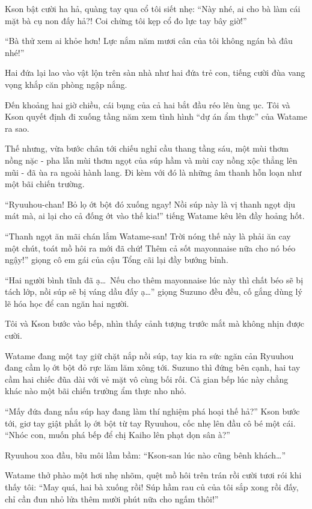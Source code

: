 \documentclass[../main.tex]{subfiles}
\begin{document}
Kson bật cười ha hả, quàng tay qua cổ tôi siết nhẹ: ``Này nhé, ai cho bà làm cái mặt bà cụ non đấy hả?! Coi chừng tôi kẹp cổ đo lực tay bây giờ!''

``Bà thử xem ai khỏe hơn! Lực nắm năm mươi cân của tôi không ngán bà đâu nhé!''

Hai đứa lại lao vào vật lộn trên sàn nhà như hai đứa trẻ con, tiếng cười đùa vang vọng khắp căn phòng ngập nắng.

\ct

Đến khoảng hai giờ chiều, cái bụng của cả hai bắt đầu réo lên ùng ục. Tôi và Kson quyết định đi xuống tầng năm xem tình hình ``dự án ẩm thực'' của Watame ra sao.

Thế nhưng, vừa bước chân tới chiếu nghỉ cầu thang tầng sáu, một mùi thơm nồng nặc - pha lẫn mùi thơm ngọt của súp hầm và mùi cay nồng xộc thẳng lên mũi - đã ùa ra ngoài hành lang. Đi kèm với đó là những âm thanh hỗn loạn như một bãi chiến trường.

``Ryuuhou-chan! Bỏ lọ ớt bột đó xuống ngay! Nồi súp này là vị thanh ngọt dịu mát mà, ai lại cho cả đống ớt vào thế kia!'' tiếng Watame kêu lên đầy hoảng hốt.

``Thanh ngọt ăn mãi chán lắm Watame-san! Trời nóng thế này là phải ăn cay một chút, toát mồ hôi ra mới đã chứ! Thêm cả sốt mayonnaise nữa cho nó béo ngậy!'' giọng cô em gái của cậu Tổng cãi lại đầy bướng bỉnh.

``Hai người bình tĩnh đã ạ\dots\ Nếu cho thêm mayonnaise lúc này thì chất béo sẽ bị tách lớp, nồi súp sẽ bị váng dầu đấy ạ\dots'' giọng Suzuno đều đều, cố gắng dùng lý lẽ hóa học để can ngăn hai người.

Tôi và Kson bước vào bếp, nhìn thấy cảnh tượng trước mắt mà không nhịn được cười.

Watame đang một tay giữ chặt nắp nồi súp, tay kia ra sức ngăn cản Ryuuhou đang cầm lọ ớt bột đỏ rực lăm lăm xông tới. Suzuno thì đứng bên cạnh, hai tay cầm hai chiếc đũa dài với vẻ mặt vô cùng bối rối. Cả gian bếp lúc này chẳng khác nào một bãi chiến trường ẩm thực nho nhỏ.

``Mấy đứa đang nấu súp hay đang làm thí nghiệm phá hoại thế hả?'' Kson bước tới, giơ tay giật phắt lọ ớt bột từ tay Ryuuhou, cốc nhẹ lên đầu cô bé một cái. ``Nhóc con, muốn phá bếp để chị Kaiho lên phạt dọn sân à?''

Ryuuhou xoa đầu, bĩu môi lầm bầm: ``Kson-san lúc nào cũng bênh khách\dots''

Watame thở phào một hơi nhẹ nhõm, quệt mồ hôi trên trán rồi cười tươi rói khi thấy tôi: ``May quá, hai bà xuống rồi! Súp hầm rau củ của tôi sắp xong rồi đấy, chỉ cần đun nhỏ lửa thêm mười phút nữa cho ngấm thôi!''
\end{document}

